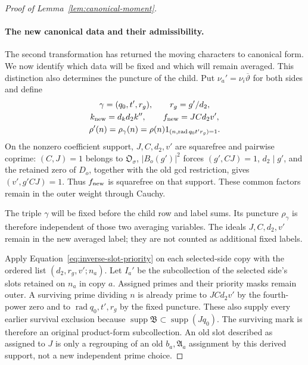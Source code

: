 \documentclass[11pt,a4paper]{article}
\numberwithin{equation}{section}
\numberwithin{figure}{section}
\theoremstyle{definition}
\theoremstyle{remark}
\begin{document}
\begin{proof}[Proof of Lemma~\ref{lem:canonical-moment}]
\paragraph{The new canonical data and their admissibility.}
The second transformation has returned the moving characters to canonical
form. We now identify which data will be fixed and which will remain
averaged. This distinction also determines the puncture of the child.
Put \(\nu_a'=\nu_i\overline\vartheta\) for both sides and define
\begin{equation}\label{eq:canonical-child-data}
 \begin{gathered}
 \gamma=(q_0,t',r_g),\qquad r_g=g'/d_2,\\
 k_{\rm new}=d_kd_2k'',\qquad f_{\rm new}=JCd_2v',\\
 \rho'(n)=\rho_\gamma(n)=\rho(n)1_{(n,\operatorname{rad}q_0t'r_g)=1}.
 \end{gathered}
\end{equation}
On the nonzero coefficient support, \(J,C,d_2,v'\) are squarefree
and pairwise coprime: \((C,J)=1\) belongs to \(\mathfrak O_\sigma\),
\(|B_o(g')|^2\) forces \((g',CJ)=1\), \(d_2\mid g'\), and the
retained zero of \(D_o\), together with the old gcd restriction, gives
\((v',g'CJ)=1\). Thus \(f_{\rm new}\) is squarefree on that support.
These common factors remain in the outer weight through Cauchy.

The triple \(\gamma\) will be fixed before the child row and label sums.
Its puncture \(\rho_\gamma\) is therefore independent of those two
averaging variables. The ideals \(J,C,d_2,v'\) remain in the new
averaged label; they are not counted as additional fixed labels.

Apply Equation~\eqref{eq:inverse-slot-priority} on each selected-side
copy with the ordered list \((d_2,r_g,v';n_a)\).  Let \(I_a'\) be the
subcollection of the selected side's slots retained on \(n_a\) in copy
\(a\).  Assigned primes and their priority masks remain outer.
A surviving prime dividing \(n\)
is already prime to \(JCd_2v'\) by the fourth-power zero and to
\(\operatorname{rad}q_0,t',r_g\) by the fixed puncture.  These also
supply every earlier survival exclusion because
\(\operatorname{supp}\mathfrak B\subset\operatorname{supp}(Jq_0)\).
The surviving mark is therefore an original product-form subcollection.
An old slot described as assigned to \(J\) is only a regrouping of an
old \(b_a,\mathfrak A_a\) assignment by this derived support, not a
new independent prime choice.


\end{proof}
\end{document}
